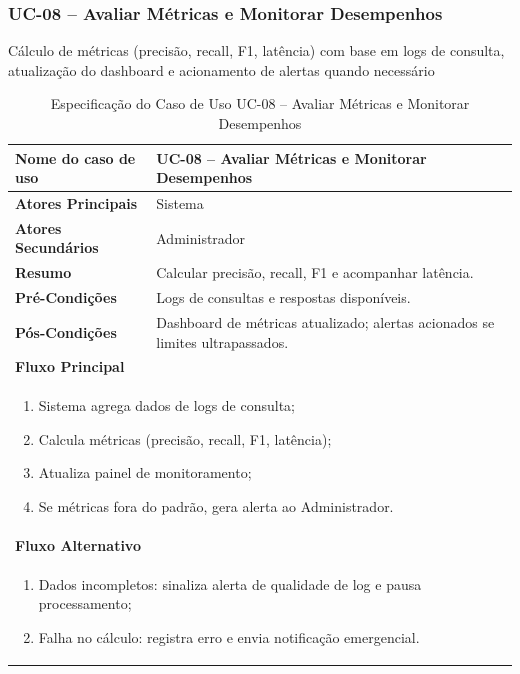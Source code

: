 \begin{description}
\subsubsection{UC-08 – Avaliar Métricas e Monitorar Desempenhos}
\noindent Cálculo de métricas (precisão, recall, F1, latência) com base em logs de consulta, atualização do dashboard e acionamento de alertas quando necessário
\begin{table}[H]
  \centering
  \caption{Especificação do Caso de Uso UC-08 – Avaliar Métricas e Monitorar Desempenhos}
  \label{tab:uc08}
  \begin{tabular}{|p{4cm}|p{11cm}|}
    \hline
    \textbf{Nome do caso de uso}    & UC-08 – Avaliar Métricas e Monitorar Desempenhos \\ \hline
    \textbf{Atores Principais}      & Sistema                                           \\ \hline
    \textbf{Atores Secundários}     & Administrador                                     \\ \hline
    \textbf{Resumo}                 & Calcular precisão, recall, F1 e acompanhar latência. \\ \hline
    \textbf{Pré-Condições}          & Logs de consultas e respostas disponíveis. \\ \hline
    \textbf{Pós-Condições}          & Dashboard de métricas atualizado; alertas acionados se limites ultrapassados. \\ \hline
    \multicolumn{2}{|l|}{\textbf{Fluxo Principal}} \\ \hline
    \multicolumn{2}{|p{15cm}|}{%
      \begin{enumerate}[leftmargin=*]
        \item Sistema agrega dados de logs de consulta;
        \item Calcula métricas (precisão, recall, F1, latência);
        \item Atualiza painel de monitoramento;
        \item Se métricas fora do padrão, gera alerta ao Administrador.
      \end{enumerate}
    } \\ \hline
    \multicolumn{2}{|l|}{\textbf{Fluxo Alternativo}} \\ \hline
    \multicolumn{2}{|p{15cm}|}{%
      \begin{enumerate}[label=\arabic* a\,.]
        \item Dados incompletos: sinaliza alerta de qualidade de log e pausa processamento;
        \item Falha no cálculo: registra erro e envia notificação emergencial.
      \end{enumerate}
    } \\ \hline
  \end{tabular}
\end{table}


\end{description}
